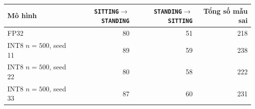 \begin{tabular}{lrrr}
\toprule
Mô hình & \texttt{SITTING}$\to$\texttt{STANDING} & \texttt{STANDING}$\to$\texttt{SITTING} & Tổng số mẫu sai \\
\midrule
FP32 & 80 & 51 & 218 \\
INT8 $n=500$, seed 11 & 89 & 59 & 238 \\
INT8 $n=500$, seed 22 & 80 & 58 & 222 \\
INT8 $n=500$, seed 33 & 87 & 60 & 231 \\
\bottomrule
\end{tabular}

